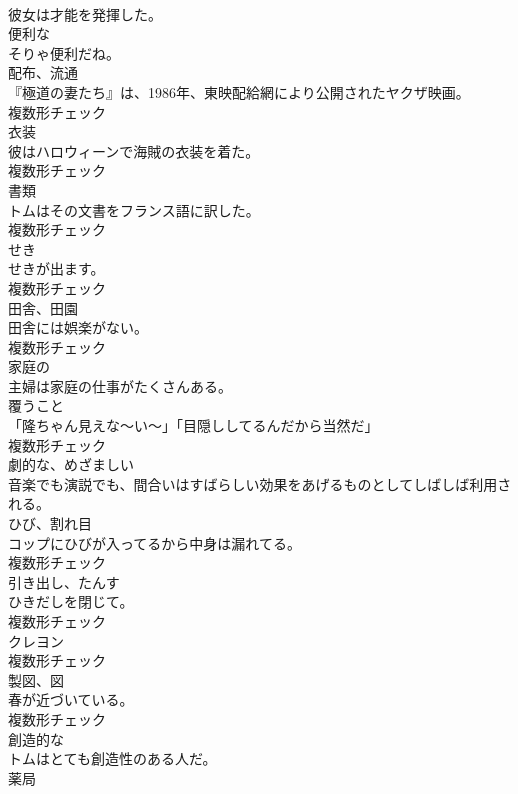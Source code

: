 \documentclass[8pt]{extreport}
\begin{document}
\begin{CJK}{UTF8}{min}
\\	彼女は才能を発揮した。	
\\	[形容詞]	便利な	
\\	そりゃ便利だね。	
\\	[名詞]	配布、流通	
\\	『極道の妻たち』は、1986年、東映配給網により公開されたヤクザ映画。	
\\	複数形チェック
\\	[名詞]	衣装	
\\	彼はハロウィーンで海賊の衣装を着た。	
\\	複数形チェック
\\	[名詞]	書類	
\\	トムはその文書をフランス語に訳した。	
\\	複数形チェック
\\	[名詞]	せき	
\\	せきが出ます。	
\\	複数形チェック
\\	[名詞]	田舎、田園	
\\	田舎には娯楽がない。	
\\	複数形チェック
\\	[形容詞]	家庭の	
\\	主婦は家庭の仕事がたくさんある。	
\\	[名詞]	覆うこと	
\\	「隆ちゃん見えな～い～」「目隠ししてるんだから当然だ」	
\\	複数形チェック
\\	[形容詞]	劇的な、めざましい	
\\	音楽でも演説でも、間合いはすばらしい効果をあげるものとしてしばしば利用される。	
\\	[名詞]	ひび、割れ目	
\\	コップにひびが入ってるから中身は漏れてる。	
\\	複数形チェック
\\	[名詞]	引き出し、たんす	
\\	ひきだしを閉じて。	
\\	複数形チェック
\\	[名詞]	クレヨン	
\\	複数形チェック
\\	[名詞]	製図、図	
\\	春が近づいている。	
\\	複数形チェック
\\	[形容詞]	創造的な	
\\	トムはとても創造性のある人だ。	
\\	[名詞]	薬局	

\end{CJK}
\end{document}
